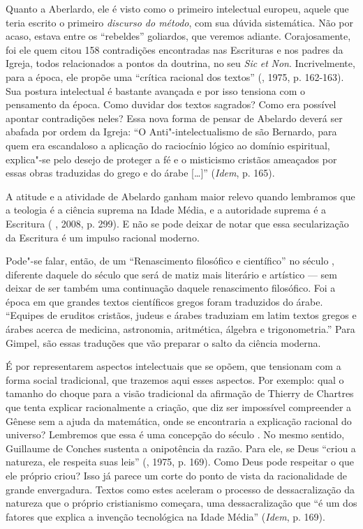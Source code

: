 Quanto a Aberlardo, ele é visto como o primeiro intelectual europeu,
aquele que teria escrito o primeiro \emph{discurso do método}, com sua
dúvida sistemática. Não por acaso, estava entre os ``rebeldes''
goliardos, que veremos adiante. Corajosamente, foi ele quem citou 158
contradições encontradas nas Escrituras e nos padres da Igreja, todos
relacionados a pontos da doutrina, no seu \emph{Sic} \emph{et}
\emph{Non}. Incrivelmente, para a época, ele propõe uma ``crítica
racional dos textos'' (, 1975, p. 162-163). Sua postura
intelectual é bastante avançada e por isso tensiona com o pensamento da
época. Como duvidar dos textos sagrados? Como era possível apontar
contradições neles? Essa nova forma de pensar de Abelardo deverá ser
abafada por ordem da Igreja: ``O Anti"-intelectualismo de são Bernardo,
para quem era escandaloso a aplicação do raciocínio lógico ao domínio
espiritual, explica"-se pelo desejo de proteger a fé e o misticismo
cristãos ameaçados por essas obras traduzidas do grego e do árabe
[\ldots{}]'' (\emph{Idem}, p. 165).

A atitude e a atividade de Abelardo ganham maior relevo quando lembramos
que a teologia é a ciência suprema na Idade Média, e a autoridade
suprema é a Escritura ( , 2008, p. 299). E não se pode deixar de
notar que essa secularização da Escritura é um impulso racional moderno.

Pode"-se falar, então, de um ``Renascimento filosófico e científico'' no
século , diferente daquele do século  que será de matiz mais
literário e artístico --- sem deixar de ser também uma continuação
daquele renascimento filosófico. Foi a época em que grandes textos
científicos gregos foram traduzidos do árabe. ``Equipes de eruditos
cristãos, judeus e árabes traduziam em latim textos gregos e árabes
acerca de medicina, astronomia, aritmética, álgebra e trigonometria.''
Para Gimpel, são essas traduções que vão preparar o salto da ciência
moderna.

É por representarem aspectos intelectuais que se opõem, que tensionam
com a forma social tradicional, que trazemos aqui esses aspectos. Por
exemplo: qual o tamanho do choque para a visão tradicional da afirmação
de Thierry de Chartres que tenta explicar racionalmente a criação, que
diz ser impossível compreender a Gênese sem a ajuda da matemática, onde
se encontraria a explicação racional do universo? Lembremos que essa é
uma concepção do século . No mesmo sentido, Guillaume de Conches
sustenta a onipotência da razão. Para ele, se Deus ``criou a
natureza, ele respeita suas leis'' (, 1975, p. 169). Como Deus
pode respeitar o que ele próprio criou? Isso já parece um corte do ponto
de vista da racionalidade de grande envergadura. Textos como estes
aceleram o processo de dessacralização da natureza que o próprio
cristianismo começara, uma dessacralização que ``é um dos fatores que
explica a invenção tecnológica na Idade Média'' (\emph{Idem}, p. 169).

